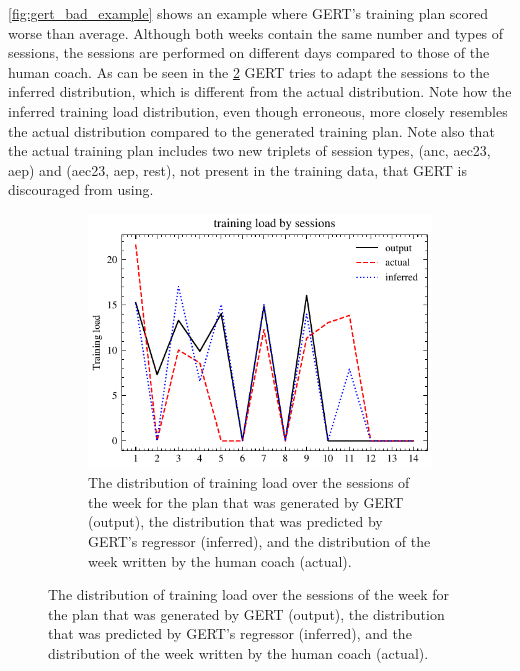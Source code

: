 \cref{fig:gert_bad_example} shows an example where GERT's training plan scored worse than average.
Although both weeks contain the same number and types of sessions, the sessions are performed on different days compared to those of the human coach. 
As can be seen in the \cref{fig:gert_bad_example_distribution} GERT tries to adapt the sessions to the inferred distribution, which is different from the actual distribution.
Note how the inferred training load distribution, even though erroneous, more closely resembles the actual distribution compared to the generated training plan.
Note also that the actual training plan includes two new triplets of session types, (anc, aec23, aep) and (aec23, aep, rest), not present in the training data, that GERT is discouraged from using.

\begin{figure}[ht]
    \centering
    \begin{subfigure}[t]{0.7\textwidth}
        \centering
        \includegraphics[width=\textwidth]{chapters/figures/result_examples/bad_dist.pdf}
        \captionsetup{width=.9\linewidth}
        \caption{The distribution of training load over the sessions of the week for the plan that was generated by GERT (output), the distribution that was predicted by GERT's regressor (inferred), and the distribution of the week written by the human coach (actual).}
        \label{fig:gert_bad_example_distribution}
    \end{subfigure}


\end{figure}
